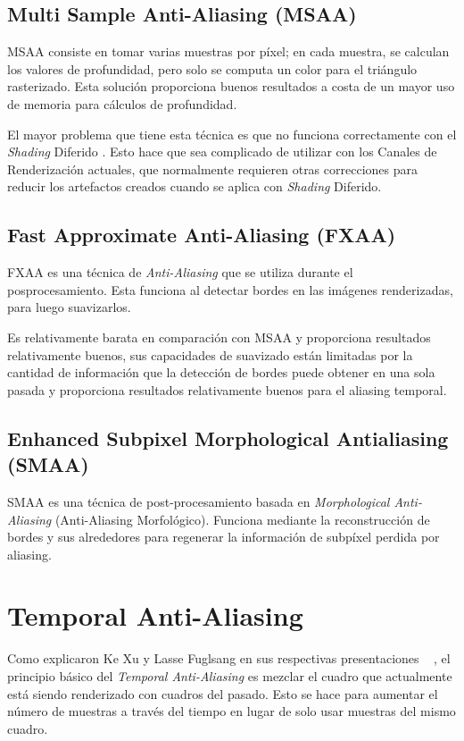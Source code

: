 \documentclass[pregrado]{tesis-usb} %
\begin{document}
\subsection{Multi Sample Anti-Aliasing (MSAA)}
MSAA consiste en tomar varias muestras por píxel; en cada muestra, se calculan los valores de profundidad, pero solo se computa un color para el triángulo rasterizado. Esta solución proporciona buenos resultados a costa de un mayor uso de memoria para cálculos de profundidad.

El mayor problema que tiene esta técnica es que no funciona correctamente con el \textit{Shading} Diferido \cite{Doggett2017EDAN35}. Esto hace que sea complicado de utilizar con los Canales de Renderización actuales, que normalmente requieren otras correcciones para reducir los artefactos creados cuando se aplica con \textit{Shading} Diferido.


\subsection{Fast Approximate Anti-Aliasing (FXAA)}
FXAA es una técnica de \textit{Anti-Aliasing} que se utiliza durante el posprocesamiento. Esta funciona al detectar bordes en las imágenes renderizadas, para luego suavizarlos. \cite{Lottes2009}

Es relativamente barata en comparación con MSAA y proporciona resultados relativamente buenos, sus capacidades de suavizado están limitadas por la cantidad de información que la detección de bordes puede obtener en una sola pasada y proporciona resultados relativamente buenos para el aliasing temporal.

\subsection{Enhanced Subpixel Morphological Antialiasing (SMAA)}
SMAA es una técnica de post-procesamiento basada en \textit{Morphological Anti-Aliasing} (Anti-Aliasing Morfológico). Funciona mediante la reconstrucción de bordes y sus alrededores para regenerar la información de subpíxel perdida por aliasing. \cite{Jimenez2012}

\section{Temporal Anti-Aliasing}
Como explicaron Ke Xu y Lasse Fuglsang en sus respectivas presentaciones ~ \cite{XU2016, Fuglsand2016}, el principio básico del \textit{Temporal Anti-Aliasing} es mezclar el cuadro que actualmente está siendo renderizado con cuadros del pasado. Esto se hace para aumentar el número de muestras a través del tiempo en lugar de solo usar muestras del mismo cuadro.
\end{document}
